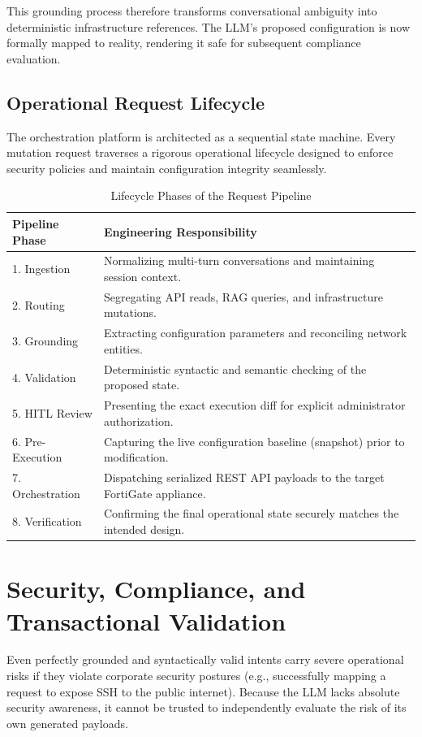 This grounding process therefore transforms conversational ambiguity into deterministic infrastructure references. The LLM's proposed configuration is now formally mapped to reality, rendering it safe for subsequent compliance evaluation.

\subsection{Operational Request Lifecycle}
The orchestration platform is architected as a sequential state machine. Every mutation request traverses a rigorous operational lifecycle designed to enforce security policies and maintain configuration integrity seamlessly.

\begin{table}[H]
    \centering
    \caption{Lifecycle Phases of the Request Pipeline}
    \label{tab:pipeline_phases}
    \renewcommand{\arraystretch}{1.2}
    \small
    \begin{tabular}{|l|p{10.5cm}|}
        \hline
        \textbf{Pipeline Phase} & \textbf{Engineering Responsibility} \\
        \hline
        1. Ingestion & Normalizing multi-turn conversations and maintaining session context. \\
        \hline
        2. Routing & Segregating API reads, RAG queries, and infrastructure mutations. \\
        \hline
        3. Grounding & Extracting configuration parameters and reconciling network entities. \\
        \hline
        4. Validation & Deterministic syntactic and semantic checking of the proposed state. \\
        \hline
        5. HITL Review & Presenting the exact execution diff for explicit administrator authorization. \\
        \hline
        6. Pre-Execution & Capturing the live configuration baseline (snapshot) prior to modification. \\
        \hline
        7. Orchestration & Dispatching serialized REST API payloads to the target FortiGate appliance. \\
        \hline
        8. Verification & Confirming the final operational state securely matches the intended design. \\
        \hline
    \end{tabular}
\end{table}

\section{Security, Compliance, and Transactional Validation}
Even perfectly grounded and syntactically valid intents carry severe operational risks if they violate corporate security postures (e.g., successfully mapping a request to expose SSH to the public internet). Because the LLM lacks absolute security awareness, it cannot be trusted to independently evaluate the risk of its own generated payloads.

